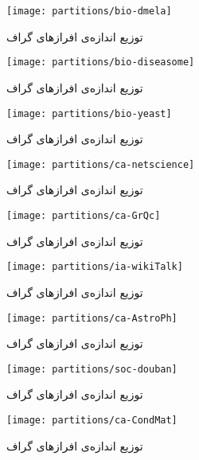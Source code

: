 \begin{figure}[!ht]
  \centering
  \texttt{[image: partitions/bio-dmela]}
  \caption{توزیع اندازه‌ی افراز‌های گراف
  }
\end{figure}

\begin{figure}[!ht]
  \centering
  \texttt{[image: partitions/bio-diseasome]}
  \caption{توزیع اندازه‌ی افراز‌های گراف
  }
\end{figure}

\clearpage
\begin{figure}[!ht]
  \centering
  \texttt{[image: partitions/bio-yeast]}
  \caption{توزیع اندازه‌ی افراز‌های گراف
  }
\end{figure}

\begin{figure}[!ht]
  \centering
  \texttt{[image: partitions/ca-netscience]}
  \caption{توزیع اندازه‌ی افراز‌های گراف
  }
\end{figure}

\begin{figure}[!ht]
  \centering
  \texttt{[image: partitions/ca-GrQc]}
  \caption{توزیع اندازه‌ی افراز‌های گراف
  }
\end{figure}

\clearpage
\begin{figure}[!ht]
  \centering
  \texttt{[image: partitions/ia-wikiTalk]}
  \caption{توزیع اندازه‌ی افراز‌های گراف
  }
\end{figure}

\begin{figure}[!ht]
  \centering
  \texttt{[image: partitions/ca-AstroPh]}
  \caption{توزیع اندازه‌ی افراز‌های گراف
  }
\end{figure}

\begin{figure}[!ht]
  \centering
  \texttt{[image: partitions/soc-douban]}
  \caption{توزیع اندازه‌ی افراز‌های گراف
  }
\end{figure}


\clearpage
\begin{figure}[!ht]
  \centering
  \texttt{[image: partitions/ca-CondMat]}
  \caption{توزیع اندازه‌ی افراز‌های گراف
  }
\end{figure}

